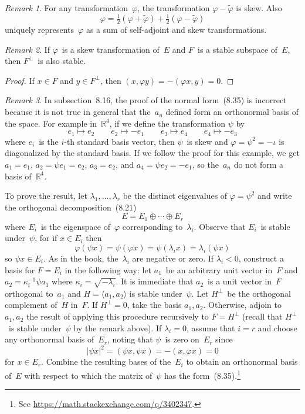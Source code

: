 \documentclass[letterpaper,12pt]{article}
\newcommand{\R}{\mathbb{R}}
\newcommand{\dsum}{\oplus}
\newcommand{\gen}[1]{\langle#1\rangle}
\newcommand{\oc}[1]{#1^{\perp}}
\newcommand{\iprod}[2]{(#1,#2)}
\newcommand{\norm}[1]{|#1|}
\newcommand{\adj}[1]{\widetilde{#1}}
\newcommand{\multi}[4]{#2_{#3}#1\cdots#1#2_{#4}}
\newcommand{\dsums}[3]{\multi{\dsum}{#1}{#2}{#3}}
\theoremstyle{definition}
\theoremstyle{remark}
\newtheorem*{rmk}{Remark}
\begin{document}
\begin{rmk}
For any transformation~\(\varphi\), the transformation \(\varphi-\adj{\varphi}\) is skew. Also
\[\varphi=\tfrac{1}{2}(\varphi+\adj{\varphi})+\tfrac{1}{2}(\varphi-\adj{\varphi})\]
uniquely represents~\(\varphi\) as a sum of self-adjoint and skew transformations.
\end{rmk}

\begin{rmk}
If \(\varphi\)~is a skew transformation of~\(E\) and \(F\)~is a stable subspace of~\(E\), then \(\oc{F}\)~is also stable.
\end{rmk}
\begin{proof}
If \(x\in F\) and \(y\in\oc{F}\), then \(\iprod{x}{\varphi y}=-\iprod{\varphi x}{y}=0\).
\end{proof}

\begin{rmk}
In subsection~8.16, the proof of the normal form~(8.35) is incorrect because it is not true in general that the~\(a_n\) defined form an orthonormal basis of the space. For example in~\(\R^4\), if we define the transformation \(\psi\) by
\[e_1\mapsto e_2\qquad e_2\mapsto -e_1\qquad e_3\mapsto e_4\qquad e_4\mapsto -e_3\]
where \(e_i\)~is the \(i\)-th standard basis vector, then \(\psi\)~is skew and \(\varphi=\psi^2=-\iota\) is diagonalized by the standard basis. If we follow the proof for this example, we get \(a_1=e_1\), \(a_2=\psi e_1=e_2\), \(a_3=e_2\), and \(a_4=\psi e_2=-e_1\), so the~\(a_n\) do not form a basis of~\(\R^4\).

To prove the result, let \(\lambda_1,\ldots,\lambda_r\) be the distinct eigenvalues of \(\varphi=\psi^2\) and write the orthogonal decomposition~(8.21)
\[E=\dsums{E}{1}{r}\]
where \(E_i\)~is the eigenspace of~\(\varphi\) corresponding to~\(\lambda_i\). Observe that \(E_i\)~is stable under~\(\psi\), for if \(x\in E_i\) then
\[\varphi(\psi x)=\psi(\varphi x)=\psi(\lambda_i x)=\lambda_i(\psi x)\]
so \(\psi x\in E_i\). As in the book, the~\(\lambda_i\) are negative or zero. If \(\lambda_i<0\), construct a basis for \(F=E_i\) in the following way: let \(a_1\)~be an arbitrary unit vector in~\(F\) and \(a_2=\kappa_i^{-1}\psi a_1\) where \(\kappa_i=\sqrt{-\lambda_i}\). It is immediate that \(a_2\)~is a unit vector in~\(F\) orthogonal to~\(a_1\) and \(H=\gen{a_1,a_2}\) is stable under~\(\psi\). Let \(\oc{H}\)~be the orthogonal complement of~\(H\) in~\(F\). If \(\oc{H}=0\), take the basis \(a_1,a_2\). Otherwise, adjoin to \(a_1,a_2\) the result of applying this procedure recursively to \(F=\oc{H}\) (recall that \(\oc{H}\)~is stable under~\(\psi\) by the remark above). If \(\lambda_i=0\), assume that \(i=r\) and choose any orthonormal basis of~\(E_r\), noting that \(\psi\)~is zero on~\(E_r\) since
\[\norm{\psi x}^2=\iprod{\psi x}{\psi x}=-\iprod{x}{\varphi x}=0\]
for \(x\in E_r\). Combine the resulting bases of the~\(E_i\) to obtain an orthonormal basis of~\(E\) with respect to which the matrix of~\(\psi\) has the form~(8.35).\footnote{See \url{https://math.stackexchange.com/q/3402347}.}
\end{rmk}
\end{document}
